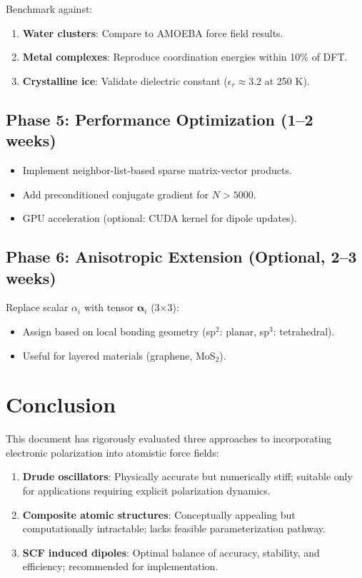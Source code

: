 \documentclass[11pt,letterpaper]{article}
\newcommand{\valpha}{\boldsymbol{\alpha}}
\begin{document}
Benchmark against:
\begin{enumerate}
    \item \textbf{Water clusters}: Compare to AMOEBA force field results\cite{ren2003}.
    \item \textbf{Metal complexes}: Reproduce coordination energies within 10\% of DFT.
    \item \textbf{Crystalline ice}: Validate dielectric constant ($\epsilon_r \approx 3.2$ at 250 K).
\end{enumerate}

\subsection{Phase 5: Performance Optimization (1--2 weeks)}

\begin{itemize}
    \item Implement neighbor-list-based sparse matrix-vector products.
    \item Add preconditioned conjugate gradient for $N > 5000$.
    \item GPU acceleration (optional: CUDA kernel for dipole updates).
\end{itemize}

\subsection{Phase 6: Anisotropic Extension (Optional, 2--3 weeks)}

Replace scalar $\alpha_i$ with tensor $\valpha_i$ (3$\times$3):
\begin{itemize}
    \item Assign based on local bonding geometry (sp$^2$: planar, sp$^3$: tetrahedral).
    \item Useful for layered materials (graphene, MoS$_2$).
\end{itemize}

\section{Conclusion}
\label{sec:conclusion}

This document has rigorously evaluated three approaches to incorporating electronic polarization into atomistic force fields:

\begin{enumerate}
    \item \textbf{Drude oscillators}: Physically accurate but numerically stiff; suitable only for applications requiring explicit polarization dynamics.
    \item \textbf{Composite atomic structures}: Conceptually appealing but computationally intractable; lacks feasible parameterization pathway.
    \item \textbf{SCF induced dipoles}: Optimal balance of accuracy, stability, and efficiency; recommended for implementation.
\end{enumerate}
\end{document}
